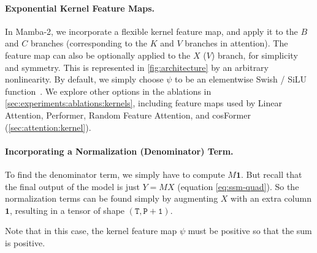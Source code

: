 \paragraph{Exponential Kernel Feature Maps.}

In Mamba-2, we incorporate a flexible kernel feature map, and apply it to the $B$ and $C$ branches (corresponding to the $K$ and $V$ branches in attention).
The feature map can also be optionally applied to the $X$ ($V$) branch, for simplicity and symmetry.
This is represented in \cref{fig:architecture} by an arbitrary nonlinearity.
By default, we simply choose $\psi$ to be an elementwise Swish / SiLU function~\citep{hendrycks2016gaussian,ramachandran2017swish}.
We explore other options in the ablations in \cref{sec:experiments:ablations:kernels},
including feature maps used by Linear Attention, Performer, Random Feature Attention, and cosFormer (\cref{sec:attention:kernel}).

\paragraph{Incorporating a Normalization (Denominator) Term.}

To find the denominator term, we simply have to compute $M \bm{1}$.
But recall that the final output of the model is just $Y = MX$ (equation \eqref{eq:ssm-quad}).
So the normalization terms can be found
simply by augmenting $X$ with an extra column $\bm{1}$, resulting in a tensor of shape $\mathtt{(T, P+1)}$.

Note that in this case, the kernel feature map $\psi$ must be positive so that the sum is positive.
